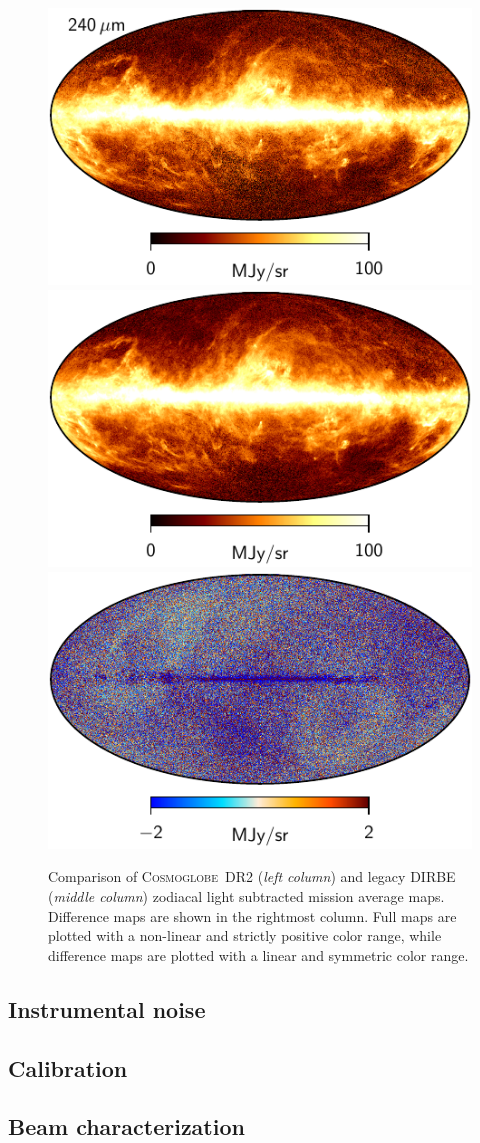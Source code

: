 \documentclass{aa}
\def\Cosmoglobe{\textsc{Cosmoglobe}}
\begin{document}
\begin{figure}
        \includegraphics[width=0.23\linewidth]{figs/CG_DIRBE_10_I_n0256_DR2.pdf}
        \includegraphics[width=0.23\linewidth]{figs/DIRBE_ZSMA_10_1_256.pdf}
        \includegraphics[width=0.23\linewidth]{figs/diff_CG_DIRBE_ZSMA_10_n256.pdf}\\
	\caption{Comparison of \Cosmoglobe\ DR2 (\emph{left column}) and legacy DIRBE (\emph{middle column}) zodiacal light subtracted mission average maps. Difference maps are shown in the rightmost column. Full maps are plotted with a non-linear and strictly positive color range, while difference maps are plotted with a linear and symmetric color range.   }
	\label{fig:freqmaps_cg_vs_dirbe}
\end{figure}



\subsection{Instrumental noise}

\subsection{Calibration}

\subsection{Beam characterization}
\end{document}
